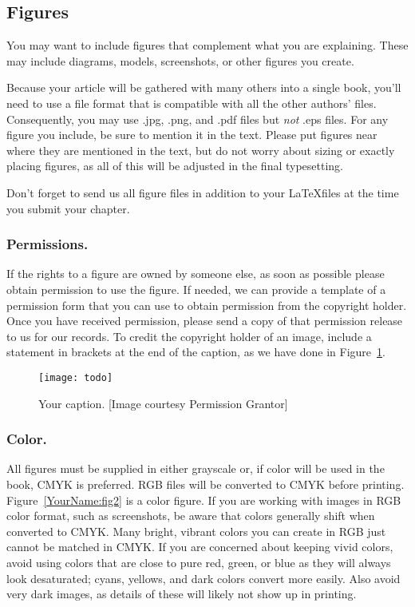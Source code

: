 \subsection{Figures}
You may want to include figures that complement what you are explaining. These may include diagrams, models, screenshots, or other figures you create.

Because your article will be gathered with many others into a single book, you'll need to use a file format that is compatible with all the other authors' files. Consequently, you may use .jpg, .png, and .pdf files but \emph{not} .eps files.
For any figure you include, be sure to mention it in the text.
Please put figures near where they are mentioned in the text, but do not worry about sizing or exactly placing figures, as all of this will be adjusted in the final typesetting.

Don't forget to send us all figure files in addition to your \LaTeX files at the time you submit your chapter.

\subsubsection{Permissions.}
If the rights to a figure are owned by someone else, as soon as possible please obtain permission to use the figure. If needed, we can provide a template of a permission form that you can use to obtain permission from the
copyright holder. Once you have received permission, please send a copy of that permission release to us for our records. To credit the copyright holder of an image, include a statement in brackets at the end of the caption, as we have done in Figure~\ref{YourName:fig1}.

\begin{figure}[htb]\centering
\texttt{[image: todo]}
\caption{Your caption. [Image courtesy Permission Grantor]}
\label{YourName:fig1}
\end{figure}

\subsubsection{Color.}
All figures must be supplied in either grayscale or, if color will be used in the book, CMYK is preferred. RGB files will be converted to CMYK before printing. Figure~\ref{YourName:fig2} is a color figure.
If you are working with images in RGB color format, such as screenshots, be aware that colors generally shift when converted to CMYK. Many bright, vibrant colors you can create in RGB just cannot be matched in CMYK. If you are concerned about keeping vivid colors, avoid using colors that are close to pure red, green, or blue as they will always look desaturated; cyans, yellows, and dark colors convert more easily. Also avoid very dark images, as details of these will likely not show up in printing.


